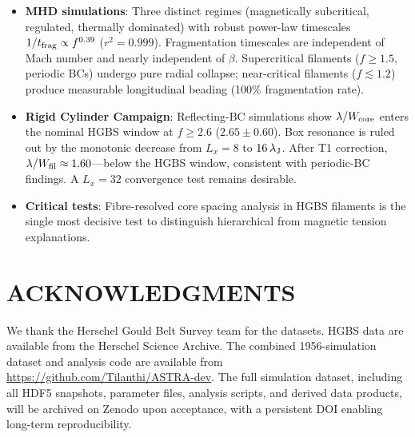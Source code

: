 \documentclass[twoside,twocolumn]{mnras}
\begin{document}
\begin{itemize}
    \item \textbf{MHD simulations}: Three distinct regimes (magnetically subcritical,
    regulated, thermally dominated) with robust power-law timescales
    $1/t_{\rm frag} \propto f^{0.39}$ ($r^2 = 0.999$). Fragmentation timescales are
    independent of Mach number and nearly independent of $\beta$. Supercritical filaments
    ($f \geq 1.5$, periodic BCs) undergo pure radial collapse; near-critical filaments
    ($f \lesssim 1.2$) produce measurable longitudinal beading (100\% fragmentation rate).

    \item \textbf{Rigid Cylinder Campaign}: Reflecting-BC simulations show $\lambda/W_{\rm core}$
    enters the nominal HGBS window at $f \geq 2.6$ ($2.65 \pm 0.60$). Box resonance is
    ruled out by the monotonic decrease from $L_x = 8$ to $16\,\lambda_{\rm J}$.
    After T1 correction, $\lambda/W_{\rm fil} \approx 1.60$---below the HGBS window,
    consistent with periodic-BC findings. A $L_x = 32$ convergence test remains desirable.

    \item \textbf{Critical tests}: Fibre-resolved core spacing analysis in HGBS
    filaments is the single most decisive test to distinguish hierarchical from magnetic
    tension explanations.

\end{itemize}

\section*{ACKNOWLEDGMENTS}

We thank the Herschel Gould Belt Survey team for the datasets. HGBS data are available
from the Herschel Science Archive. The combined 1956-simulation dataset and analysis
code are available from \url{https://github.com/Tilanthi/ASTRA-dev}. The full simulation
dataset, including all HDF5 snapshots, parameter files, analysis scripts, and derived
data products, will be archived on Zenodo upon acceptance, with a persistent DOI enabling
long-term reproducibility.



\end{document}
